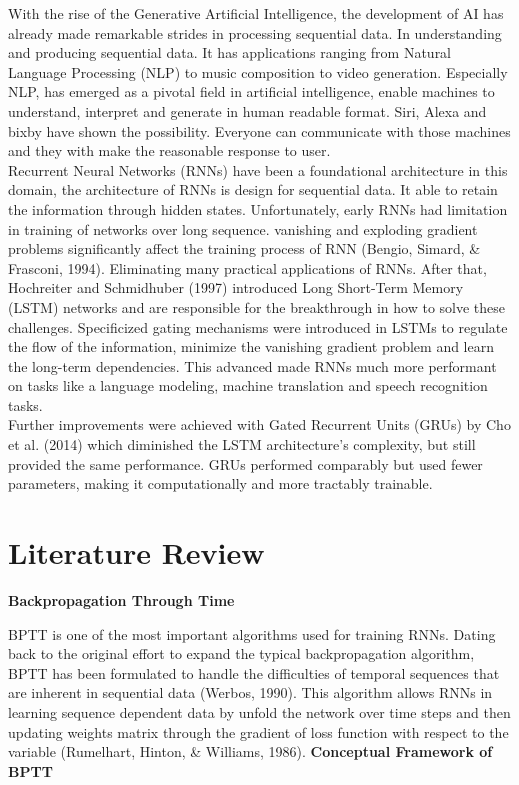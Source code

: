 \documentclass[12pt,a4paper]{article}
\begin{document}
With the rise of the Generative Artificial Intelligence, the development of AI has already made remarkable strides in processing sequential data. In understanding and producing sequential data. It has applications ranging from Natural Language Processing (NLP) to music composition to video generation. Especially NLP, has emerged as a pivotal field in artificial intelligence, enable machines to understand, interpret and generate in human readable format. Siri, Alexa and bixby have shown the possibility. Everyone can communicate with those machines and they with make the reasonable response to user.\\[2ex]
Recurrent Neural Networks (RNNs) have been a foundational architecture in this domain, the architecture of RNNs is design for sequential data. It able to retain the information through hidden states. Unfortunately, early RNNs had limitation in training of networks over long sequence. vanishing and exploding gradient problems significantly affect the training process of RNN (Bengio, Simard, \& Frasconi, 1994). Eliminating many practical applications of RNNs. After that, Hochreiter and Schmidhuber (1997) introduced Long Short-Term Memory (LSTM) networks and are responsible for the breakthrough in how to solve these challenges. Specificized gating mechanisms were introduced in LSTMs to regulate the flow of the information, minimize the vanishing gradient problem and learn the long-term dependencies. This advanced made RNNs much more performant on tasks like a language modeling, machine translation and speech recognition tasks.\\[2ex]
Further improvements were achieved with Gated Recurrent Units (GRUs) by Cho et al. (2014) which diminished the LSTM architecture's complexity, but still provided the same performance. GRUs performed comparably but used fewer parameters, making it computationally and more tractably trainable.

\newpage
\section{Literature Review}
\textbf{Backpropagation Through Time}

BPTT is one of the most important algorithms used for training RNNs. Dating back to the original effort to expand the typical backpropagation algorithm, BPTT has been formulated to handle the difficulties of temporal sequences that are inherent in sequential data (Werbos, 1990). This algorithm allows RNNs in learning sequence dependent data by unfold the network over time steps and then updating weights matrix through the gradient of loss function with respect to the variable (Rumelhart, Hinton, \& Williams, 1986).
\newline
\textbf{Conceptual Framework of BPTT}
\end{document}
